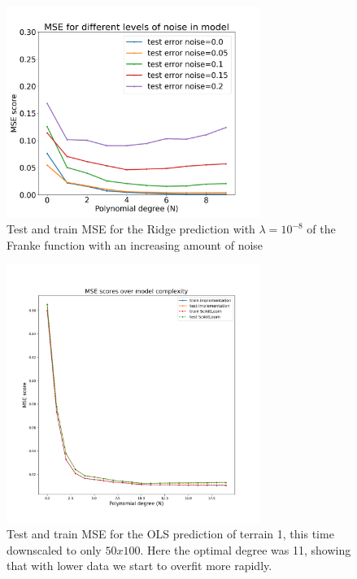 \documentclass[twocolumn,10pt,cleanfoot]{asme2ej}
\begin{document}
\begin{figure}
\centerline{\includegraphics[width=3.25in]{figure/frankeridgenoisecomparison.png}}
\caption{Test and train MSE for the Ridge prediction with $\lambda = 10^{-8}$ of the Franke function with an increasing amount of noise}
\label{frankeridgenoisecomparison}
\end{figure}

\begin{figure}
\centerline{\includegraphics[width=3.25in]{figure/real1mselessdata.png}}
\caption{Test and train MSE for the OLS prediction of terrain 1, this time downscaled to only $50x100$. Here the optimal degree was 11, showing that with lower data we start to overfit more rapidly.}
\label{real1mselessdata}
\end{figure}
\end{document}
